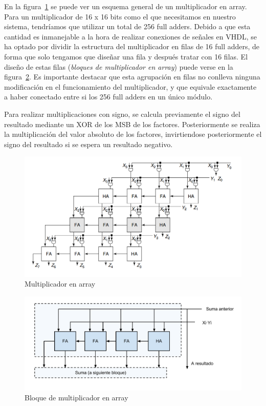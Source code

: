 \documentclass[a4paper,12pt]{article}
\begin{document}
En la figura~\ref{fig:array_multiplier} se puede ver un esquema general de un multiplicador en array. Para un multiplicador de 16 x 16 bits como el que necesitamos en nuestro sistema, tendríamos que utilizar un total de 256 full adders. Debido a que esta cantidad es inmanejable a la hora de realizar conexiones de señales en VHDL, se ha optado por dividir la estructura del multiplicador en filas de 16 full adders, de forma que solo tengamos que diseñar una fila y después tratar con 16 filas. El diseño de estas filas (\emph{bloques de multiplicador en array}) puede verse en la figura~\ref{fig:array_multiplier_block}. Es importante destacar que esta agrupación en filas no conlleva ninguna modificación en el funcionamiento del multiplicador, y que equivale exactamente a haber conectado entre si los 256 full adders en un único módulo.

Para realizar multiplicaciones con signo, se calcula previamente el signo del resultado mediante un XOR de los MSB de los factores. Posteriormente se realiza la multiplicación del valor absoluto de los factores, invirtiendose posteriormente el signo del resultado si se espera un resultado negativo.

\begin{figure}[hbt]
\includegraphics[width=\textwidth]{img/array_multiplier.png} 
\caption{Multiplicador en array} \label{fig:array_multiplier}
\end{figure}

\begin{figure}[hbt]
\includegraphics[width=\textwidth]{img/array_mult_block.pdf} 
\caption{Bloque de multiplicador en array} \label{fig:array_multiplier_block}
\end{figure}
\end{document}
